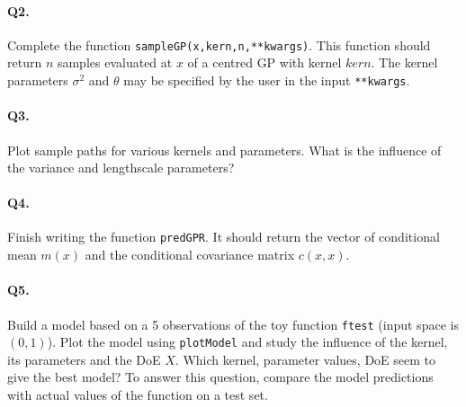 \documentclass[12pt]{scrartcl}
\begin{document}
\paragraph{Q2.} Complete the function \texttt{sampleGP(x,kern,n,**kwargs)}. This function should return $n$ samples evaluated at $x$ of a centred GP with kernel $kern$. The kernel parameters $\sigma^2$ and $\theta$ may be specified by the user in the input \texttt{**kwargs}.

\paragraph{Q3.} Plot sample paths for various kernels and parameters. What is the influence of the variance and lengthscale parameters?

\paragraph{Q4.} Finish writing the function \texttt{predGPR}. It should return the vector of conditional mean $m(x)$ and the conditional covariance matrix $c(x,x)$.

\paragraph{Q5.} Build a model based on a 5 observations of the toy function \texttt{ftest} (input space is $(0,1)$). Plot the model using \texttt{plotModel} and study the influence of the kernel, its parameters and the DoE $X$. Which kernel, parameter values, DoE seem to give the best model? To answer this question, compare the model predictions with actual values of the function on a test set. 
\end{document}
